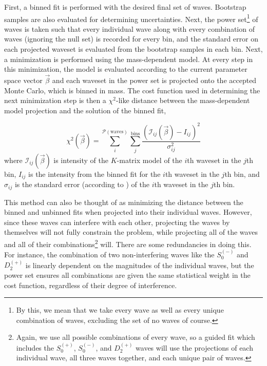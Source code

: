 First, a binned fit is performed with the desired final set of waves. Bootstrap samples are also evaluated for determining uncertainties. Next, the power set\footnote{By this, we mean that we take every wave as well as every unique combination of waves, excluding the set of no waves of course.} of waves is taken such that every individual wave along with every combination of waves (ignoring the null set) is recorded for every bin, and the standard error on each projected waveset is evaluated from the bootstrap samples in each bin. Next, a minimization is performed using the mass-dependent model. At every step in this minimization, the model is evaluated according to the current parameter space vector $\vec{\beta}$ and each waveset in the power set is projected onto the accepted Monte Carlo, which is binned in mass. The cost function used in determining the next minimization step is then a $\chi^2$-like distance between the mass-dependent model projection and the solution of the binned fit,

\begin{equation}
  \chi^2(\vec{\beta}) = \sum_i^{\mathcal{P}(\text{waves})} \sum_j^{\text{bins}} \frac{(\mathcal{I}_{ij}(\vec{\beta}) - I_{ij})^2}{\sigma_{ij}^2}
\end{equation}
where $\mathcal{I}_{ij}(\vec{\beta})$ is intensity of the $K$-matrix model of the $i$th waveset in the $j$th bin, $I_{ij}$ is the intensity from the binned fit for the $i$th waveset in the $j$th bin, and $\sigma_{ij}$ is the standard error (according to ) of the $i$th waveset in the $j$th bin.

This method can also be thought of as minimizing the distance between the binned and unbinned fits when projected into their individual waves. However, since these waves can interfere with each other, projecting the waves by themselves will not fully constrain the problem, while projecting all of the waves and all of their combinations\footnote{Again, we use all possible combinations of every wave, so a guided fit which includes the $S_0^{(+)}$, $S_0^{(-)}$, and $D_2^{(+)}$ waves will use the projections of each individual wave, all three waves together, and each unique pair of waves.} will. There are some redundancies in doing this. For instance, the combination of two non-interfering waves like the $S_0^{(-)}$ and $D_2^{(+)}$ is linearly dependent on the magnitudes of the individual waves, but the power set ensures all combinations are given the same statistical weight in the cost function, regardless of their degree of interference.

